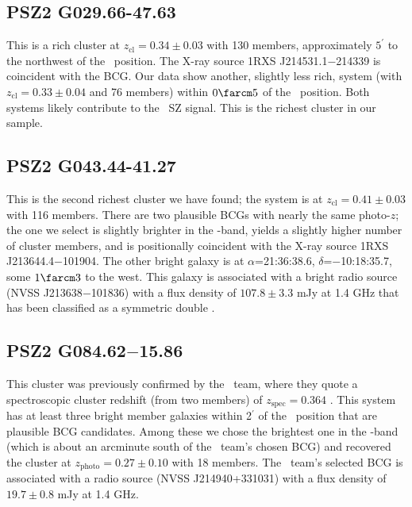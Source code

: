 \documentclass[apj, revtex4-1]{emulateapj}
\begin{document}
\subsection{PSZ2 G029.66-47.63} %
This is a rich cluster at $z_\mathrm{cl} = 0.34 \pm 0.03$ with 130 members, approximately $5^\prime$ to the northwest of the \planck\ position. The X-ray source 1RXS J214531.1$-$214339 is coincident with the BCG. Our data show another, slightly less rich, system (with $z_\mathrm{cl} = 0.33 \pm 0.04$ and 76 members) within $0\farcm5$ of the \planck\ position. Both systems likely contribute to the \planck\ SZ signal. This is the richest cluster in our sample.

\subsection{PSZ2 G043.44-41.27} %
This is the second richest cluster we have found; the system is at $z_\mathrm{cl} = 0.41 \pm 0.03$ with 116 members. There are two plausible BCGs with nearly the same photo-$z$; the one we select is slightly brighter in the \sdssi-band, yields a slightly higher number of cluster members, and is positionally coincident with the X-ray source 1RXS J213644.4$-$101904. The other bright galaxy is at $\alpha$=21:36:38.6, $\delta$=$-$10:18:35.7, some $1\farcm3$ to the west. This galaxy is associated with a bright radio source (NVSS J213638$-$101836) with a flux density of $107.8 \pm 3.3$ mJy at 1.4 GHz that has been classified as a symmetric double \citep{Douglas1996}.

\subsection{PSZ2 G084.62$-$15.86} %
This cluster was previously confirmed by the \planck\ team, where they quote a spectroscopic cluster redshift (from two members) of $z_\mathrm{spec} = 0.364$ \citep{PlanckCollaboration2016a}. This system has at least three bright member galaxies within 2$^\prime$ of the \planck\ position that are plausible BCG candidates. Among these we chose the brightest one in the \sdssi-band (which is about an arcminute south of the \planck\ team's chosen BCG) and recovered the cluster at $z_\mathrm{photo} = 0.27 \pm 0.10$ with 18 members.
The \planck\ team's selected BCG is associated with a radio source (NVSS J214940+331031) with a flux density of $19.7\pm 0.8$ mJy at 1.4 GHz.
\end{document}
